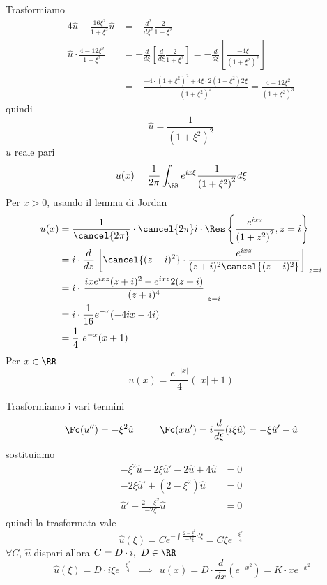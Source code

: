 Trasformiamo
\begin{align*}
4\hat{u} - \frac{16\xi^{2}}{1 + \xi^{2}}\hat{u} & = - \frac{d^{2}}{d\xi^{2}}\frac{2}{1 + \xi^{2}}\\
\hat{u} \cdot \frac{4 - 12\xi^{2}}{1 + \xi^{2}} & = - \frac{d}{d\xi}\left[\frac{d}{d\xi}\frac{2}{1 + \xi^{2}}\right] = - \frac{d}{d\xi}\left[\frac{- 4\xi}{\left(1 + \xi^{2}\right)^{2}}\right]\\
 & = - \frac{- 4 \cdot \left(1 + \xi^{2}\right)^{2} + 4\xi \cdot 2\left(1 + \xi^{2}\right) 2\xi}{\left(1 + \xi^{2}\right)^{4}} = \frac{4 - 12\xi^{2}}{\left(1 + \xi^{2}\right)^{3}}
\end{align*}
quindi
\begin{equation*}
\hat{u} = \frac{1}{\left(1 + \xi^{2}\right)^{2}}
\end{equation*}
$\hat{u}$ reale pari
\begin{equation*}
u(x) = \frac{1}{2\pi}\int_{\RR} e^{ix\xi}\frac{1}{\left(1 + \xi^{2}\right)^{2}} d\xi
\end{equation*}
Per $x > 0$, usando il lemma di Jordan
\begin{align*}
u(x) & = \frac{1}{\cancel{2\pi}} \cdot \cancel{2\pi} i \cdot \Res \left\{\frac{e^{ixz}}{\left(1 + z^{2}\right)^{2}}, z = i\right\}\\
 & = i \cdot \frac{d}{dz}\left. \left[\cancel{(z - i)^{2}} \cdot \frac{e^{ixz}}{(z + i)^{2}\cancel{(z - i)^{2}}}\right]\right|_{z = i}\\
 & = i \cdot \left. \frac{ixe^{ixz}(z + i)^{2} - e^{ixz} 2(z + i)}{(z + i)^{4}}\right|_{z = i}\\
 & = i \cdot \frac{1}{16} e^{- x}(- 4ix - 4i)\\
 & = \frac{1}{4} \ e^{- x}(x + 1)
\end{align*}
Per $x\in \RR $
\begin{equation*}
u(x) = \frac{e^{- | x|}}{4}(| x| + 1)
\end{equation*}

\Soluzione

Trasformiamo i vari termini
\begin{equation*}
\Fc (u'') = - \xi^{2}\hat{u} \ \ \ \ \ \ \ \ \Fc (xu') = i\frac{d}{d\xi}(i\xi \hat{u}) = - \xi \hat{u}' - \hat{u}
\end{equation*}
sostituiamo
\begin{align*}
- \xi^{2}\hat{u} - 2\xi \hat{u}' - 2\hat{u} + 4\hat{u} & = 0\\
- 2\xi \hat{u}' + \left(2 - \xi^{2}\right)\hat{u} & = 0\\
\hat{u}' + \frac{2 - \xi^{2}}{- 2\xi}\hat{u} & = 0
\end{align*}
quindi la trasformata vale
\begin{equation*}
\hat{u}(\xi) = Ce^{- \int \frac{2 - \xi^{2}}{- 2\xi} d\xi} = C\xi e^{- \frac{\xi^{2}}{4}}
\end{equation*}
$\forall C$, $\hat{u}$ dispari allora $C = D \cdot i, \ D\in \RR $
\begin{equation*}
\ \hat{u}(\xi) = D \cdot i\xi e^{- \frac{\xi^{2}}{4}} \ \ \implies \ \ u(x) = D \cdot \frac{d}{dx}\left(e^{- x^{2}}\right) = K \cdot xe^{- x^{2}}
\end{equation*}
